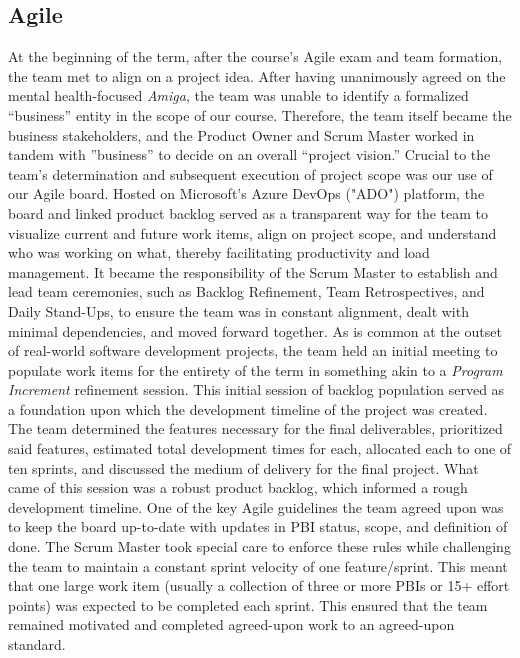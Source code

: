 \documentclass[10pt,american english]{article}
\begin{document}
\subsection*{Agile}
At the beginning of the term, after the course's Agile exam and team formation, the team met to align on a project idea. After having unanimously agreed on the mental health-focused \textit{Amiga}, the team was unable to identify a formalized ``business'' entity in the scope of our course. Therefore, the team itself became the business stakeholders, and the Product Owner and Scrum Master worked in tandem with ''business'' to decide on an overall ``project vision.''
\newline
\newline
Crucial to the team's determination and subsequent execution of project scope was our use of our Agile board. Hosted on Microsoft's Azure DevOps ("ADO") platform, the board and linked product backlog served as a transparent way for the team to visualize current and future work items, align on project scope, and understand who was working on what, thereby facilitating productivity and load management. It became the responsibility of the Scrum Master to establish and lead team ceremonies, such as Backlog Refinement, Team Retrospectives, and Daily Stand-Ups, to ensure the team was in constant alignment, dealt with minimal dependencies, and moved forward together.
\newline
\newline
As is common at the outset of real-world software development projects, the team held an initial meeting to populate work items for the entirety of the term in something akin to a \textit{Program Increment} refinement session. This initial session of backlog population served as a foundation upon which the development timeline of the project was created. The team determined the features necessary for the final deliverables, prioritized said features, estimated total development times for each, allocated each to one of ten sprints, and discussed the medium of delivery for the final project. What came of this session was a robust product backlog, which informed a rough development timeline.
\newline
\newline
One of the key Agile guidelines the team agreed upon was to keep the board up-to-date with updates in PBI status, scope, and definition of done. The Scrum Master took special care to enforce these rules while challenging the team to maintain a constant sprint velocity of one feature/sprint. This meant that one large work item (usually a collection of three or more PBIs or 15+ effort points) was expected to be completed each sprint. This ensured that the team remained motivated and completed agreed-upon work to an agreed-upon standard.
\end{document}
